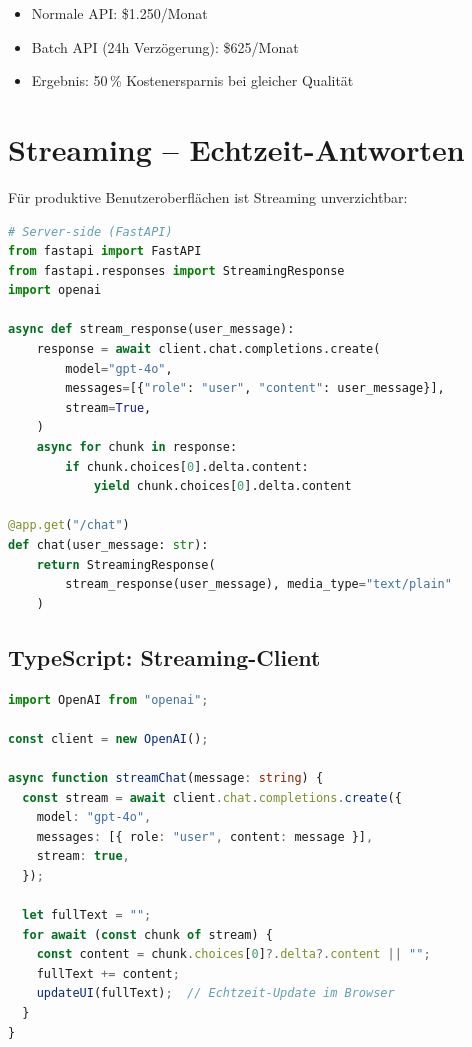 \begin{itemize}[leftmargin=*]
    \item Normale API: \$1.250/Monat
    \item Batch API (24h Verzögerung): \$625/Monat
    \item Ergebnis: 50\,\% Kostenersparnis bei gleicher Qualität
\end{itemize}

\section{Streaming -- Echtzeit-Antworten}

Für produktive Benutzeroberflächen ist Streaming unverzichtbar:

\begin{lstlisting}[language=Python, caption={Streaming-API für Echtzeit-Feedback}, label=lst:streaming]
# Server-side (FastAPI)
from fastapi import FastAPI
from fastapi.responses import StreamingResponse
import openai

async def stream_response(user_message):
    response = await client.chat.completions.create(
        model="gpt-4o",
        messages=[{"role": "user", "content": user_message}],
        stream=True,
    )
    async for chunk in response:
        if chunk.choices[0].delta.content:
            yield chunk.choices[0].delta.content

@app.get("/chat")
def chat(user_message: str):
    return StreamingResponse(
        stream_response(user_message), media_type="text/plain"
    )
\end{lstlisting}

\subsection{TypeScript: Streaming-Client}

\begin{lstlisting}[language=TypeScript, caption={Streaming-Client in TypeScript}, label=lst:ts-stream]
import OpenAI from "openai";

const client = new OpenAI();

async function streamChat(message: string) {
  const stream = await client.chat.completions.create({
    model: "gpt-4o",
    messages: [{ role: "user", content: message }],
    stream: true,
  });

  let fullText = "";
  for await (const chunk of stream) {
    const content = chunk.choices[0]?.delta?.content || "";
    fullText += content;
    updateUI(fullText);  // Echtzeit-Update im Browser
  }
}
\end{lstlisting}

